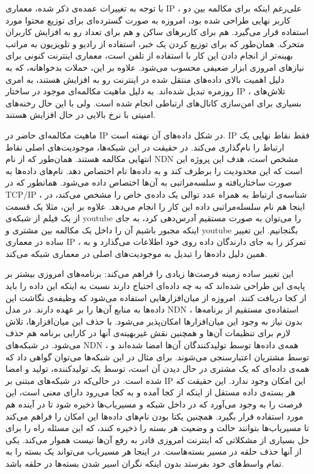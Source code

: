با توجه به تغییرات عمده‌ی ذکر شده، معماری IP ، علی‌‌رغم اینکه برای مکالمه بین دو کاربر نهایی طراحی شده بود، امروزه به صورت گسترده‌ای برای توزیع محتوا مورد استفاده قرار می‌گیرد. هم برای کاربرهای ساکن و هم برای تعداد رو به افزایش کاربران متحرک. همان‌طور که برای توزیع کردن یک خبر، استفاده از رادیو و تلویزیون به مراتب بهینه‌تر از انجام دادن این کار با استفاده از تلفن است،  معماری اینترنت کنونی برای نیازهای امروزی ابزار ضعیفی محسوب می‌شود. علاوه بر این، حملات بدخواهانه، که به دلیل اهمیت بالای داده‌های منتقل شده در اینترنت رو به افزایش هستند، به امری روزمره تبدیل شده‌اند. به دلیل ماهیت مکالمه‌ای موجود در ساختار IP ، تلاش‌های بسیاری برای امن‌سازی کانال‌های ارتباطی انجام شده است. ولی با این حال رخنه‌‌های امنیتی با نرخ بالایی در حال افزایش هستند. 

ماهیت مکالمه‌ای حاضر در IP  در شکل داده‌‌های آن نهفته است. IP فقط نقاط نهایی یک ارتباط را نام‌گذاری می‌کند. در حقیقت در این شبکه‌ها، موجودیت‌های اصلی نقاط انتهایی مکالمه هستند. همان‌طور که از نام NDN مشخص است، هدف این پروژه این است که این محدودیت را برطرف کند و به داده‌ها نام اختصاص دهد. نام‌های داده‌‌ها به صورت ساختاریافته و سلسه‌مراتبی به آن‌‌ها اختصاص داده می‌شود. همانطور که در TCP/IP ، شناسه‌ی ارتباط به همراه عدد توالی یک داده‌ی خاص را مشخص می‌کند، در اینجا هم نام سلسله‌مراتبی داده این کار را انجام می‌دهد. علاوه بر این، مثلا یک قسمت از یک فیلم از شبکه‌ی youtube را می‌توان به صورت مستقیم آدرس‌دهی کرد، به جای اینکه مجبور باشیم آن را داخل یک مکالمه بین مشتری و youtube بگنجانیم. این تغییر ساده در معماری IP ، تمرکز را به جای دارندگان داده روی خود اطلاعات می‌گذارد و به همین دلیل داده‌ها را تبدیل به موجودیت‌های اصلی در معماری شبکه می‌کند. 

این تغییر ساده زمینه فرصت‌ها زیادی را فراهم می‌کند:‌
 برنامه‌های امروزی بیشتر بر پایه‌ی این طراحی شده‌اند که به چه داده‌ای احتیاج دارند نسبت به اینکه این داده را باید از کجا دریافت کنند. امروزه از میان‌افزارهایی استفاده می‌شود که وظیفه‌ی نگاشت این داده‌ها به منابع آن‌ها را بر عهده دارند. در مدل NDN ، استفاده‌ی مستقیم از برنامه‌ها بدون نیاز به وجود این میان‌افزارها امکان‌پذیر می‌شود.  با حذف این میان‌افزارها، تلاش لازم برای تنظیمات آن‌ها و همچنین نقش غیربهینه‌ی آنها در کارایی برنامه هم حذف می‌شود.  
 در شبکه‌های NDN ،‌ همه‌ی داده‌ها توسط تولیدکنندگان آن‌ها امضا شده‌اند و توسط مشتریان اعتبارسنجی می‌شوند. برای مثال در این شبکه‌ها می‌توان گواهی داد که همه‌ی داده‌ای که یک مشتری در حال دیدن آن است، توسط یک تولیدکننده، تولید و امضا شده است. در حالی‌که در شبکه‌های مبتنی بر IP این امکان وجود ندارد. 
 این حقیقت که هر بسته‌ی داده مستقل از اینکه از کجا آمده و به کجا می‌رود دارای معنی است، این فرصت را به وجود می‌آورد که در داخل شبکه و مسیریاب‌ها ذخیره شود تا در آینده هم مورد استفاده قرار بگیرد.  همچنین یکتا بودن نام‌های داده‌ها این امکان را فراهم می‌کند تا مسیریاب‌ها بتوانند حالت و وضعیت هر بسته را ذخیره کنند، که این مسئله راه را برای حل بسیاری از مشکلاتی که اینترنت امروزی قادر به رفع آن‌ها نیست هموار می‌کند. یکی از آنها حذف حلقه در مسیر بسته‌هاست. در اینجا هر مسیریاب می‌تواند یک بسته را به تمام واسط‌های خود بفرستد بدون اینکه نگران اسیر شدن بسته‌ها در حلقه باشد. 

